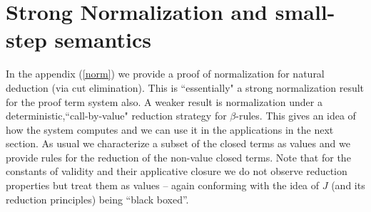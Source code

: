         \section{Strong Normalization and small-step semantics}
        In the appendix (\ref{norm}) we provide a proof of normalization for  natural deduction (via cut elimination). 
        This is ``essentially" a strong normalization result for the proof term system also. A  weaker result is 
        normalization under a  deterministic,``call-by-value" reduction strategy for $\beta$-rules.
        This   gives
        an idea of how the system computes  and we can use it in the applications in the next section. 
        As usual we characterize a subset of the closed terms as values and we provide rules for the reduction of the non-value closed terms.
        Note that for the constants of validity and their applicative closure we do not observe reduction properties but treat them as values -- again conforming with the idea of $J$ (and its reduction principles) being ``black boxed''.

